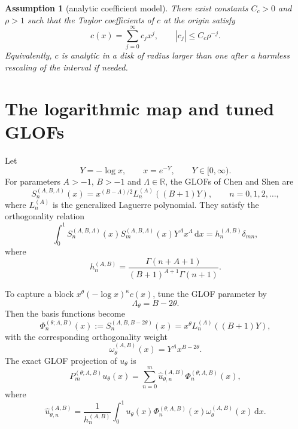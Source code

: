 \documentclass[11pt]{article}
\newtheorem{assumption}{Assumption}
\newcommand{\dd}{\,\mathrm{d}}
\newcommand{\Lag}{L}
\begin{document}
\begin{assumption}[analytic coefficient model]\label{ass:analytic}
There exist constants $C_c>0$ and $\rho>1$ such that the Taylor coefficients of $c$ at the origin satisfy
\[
    c(x)=\sum_{j=0}^\infty c_j x^j,
    \qquad |c_j|\le C_c\rho^{-j}.
\]
Equivalently, $c$ is analytic in a disk of radius larger than one after a harmless rescaling of the interval if needed.
\end{assumption}

\section{The logarithmic map and tuned GLOFs}

Let
\begin{equation}\label{eq:logmap}
    Y=-\log x,
    \qquad x=e^{-Y},
    \qquad Y\in[0,\infty).
\end{equation}
For parameters $A>-1$, $B>-1$ and $\Lambda\in\mathbb{R}$, the GLOFs of Chen and Shen are
\begin{equation}\label{eq:glof-general}
    S_n^{(A,B,\Lambda)}(x)
    =x^{(B-\Lambda)/2}\Lag_n^{(A)}((B+1)Y),
    \qquad n=0,1,2,\ldots,
\end{equation}
where $\Lag_n^{(A)}$ is the generalized Laguerre polynomial.  They satisfy the orthogonality relation
\begin{equation}\label{eq:glof-orth}
    \int_0^1
    S_n^{(A,B,\Lambda)}(x)S_m^{(A,B,\Lambda)}(x)
    Y^A x^\Lambda\dd x
    =h_n^{(A,B)}\delta_{mn},
\end{equation}
where
\begin{equation}\label{eq:hn}
    h_n^{(A,B)}=\frac{\Gamma(n+A+1)}{(B+1)^{A+1}\Gamma(n+1)}.
\end{equation}

To capture a block $x^\theta(-\log x)^\kappa c(x)$, tune the GLOF parameter by
\begin{equation}\label{eq:tunedlambda}
    \Lambda_\theta=B-2\theta.
\end{equation}
Then the basis functions become
\begin{equation}\label{eq:tunedbasis}
    \Phi_{n}^{(\theta;A,B)}(x)
    :=S_n^{(A,B,B-2\theta)}(x)
    =x^\theta\Lag_n^{(A)}((B+1)Y),
\end{equation}
with the corresponding orthogonality weight
\begin{equation}\label{eq:tunedweight}
    \omega_\theta^{(A,B)}(x)=Y^A x^{B-2\theta}.
\end{equation}
The exact GLOF projection of $u_\theta$ is
\begin{equation}\label{eq:exactproj}
    P_m^{(\theta;A,B)}u_\theta(x)
    =\sum_{n=0}^m \widehat u_{\theta,n}^{(A,B)}\Phi_n^{(\theta;A,B)}(x),
\end{equation}
where
\begin{equation}\label{eq:exactcoef}
    \widehat u_{\theta,n}^{(A,B)}
    =\frac{1}{h_n^{(A,B)}}
    \int_0^1
    u_\theta(x)\Phi_n^{(\theta;A,B)}(x)
    \omega_\theta^{(A,B)}(x)\dd x .
\end{equation}
\end{document}
